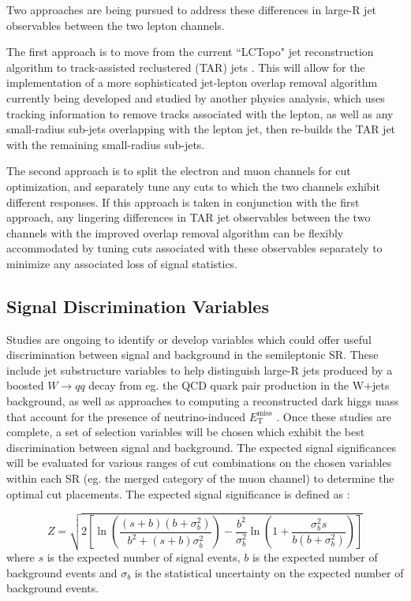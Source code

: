 \documentclass[12pt]{article}
\newcommand*{\met}{\ensuremath{E_\text{T}^\text{miss}} }
\begin{document}
Two approaches are being pursued to address these differences in large-R jet observables between the two lepton channels. 

The first approach is to move from the current ``LCTopo" jet reconstruction algorithm to track-assisted reclustered (TAR) jets \cite{TAR_jets}. This will allow for the implementation of a more sophisticated jet-lepton overlap removal algorithm currently being developed and studied by another physics analysis, which uses tracking information to remove tracks associated with the lepton, as well as any small-radius sub-jets overlapping with the lepton jet, then re-builds the TAR jet with the remaining small-radius sub-jets. 

The second approach is to split the electron and muon channels for cut optimization, and separately tune any cuts to which the two channels exhibit different responses. If this approach is taken in conjunction with the first approach, any lingering differences in TAR jet observables between the two channels with the improved overlap removal algorithm can be flexibly accommodated by tuning cuts associated with these observables separately to minimize any associated loss of signal statistics. 

\subsection{Signal Discrimination Variables}

Studies are ongoing to identify or develop variables which could offer useful discrimination between signal and background in the semileptonic SR. These include jet substructure variables to help distinguish large-R jets produced by a boosted $W\rightarrow qq$ decay from eg. the QCD quark pair production in the W+jets background, as well as approaches to computing a reconstructed dark higgs mass that account for the presence of neutrino-induced \met\!. Once these studies are complete, a set of selection variables will be chosen which exhibit the best discrimination between signal and background. The expected signal significances will be evaluated for various ranges of cut combinations on the chosen variables within each SR (eg. the merged category of the muon channel)  to determine the optimal cut placements. The expected signal significance is defined as \cite{cowandiscovery}:

\begin{equation}
  Z = \sqrt{2\left[
    \ln\left( \frac{(s+b)(b+\sigma_b^2)}{b^2 + (s+b)\sigma_b^2} \right)
    - \frac{b^2}{\sigma_b^2}\ln\left( 1 + \frac{\sigma_b^2 s}{b(b+\sigma_b^2)} \right)
  \right]}
  \label{eq:asimovsig}
\end{equation}
\noindent where $s$ is the expected number of signal events, $b$ is the expected number of background events and $\sigma_b$ is the statistical uncertainty on the expected number of background events.
\end{document}
